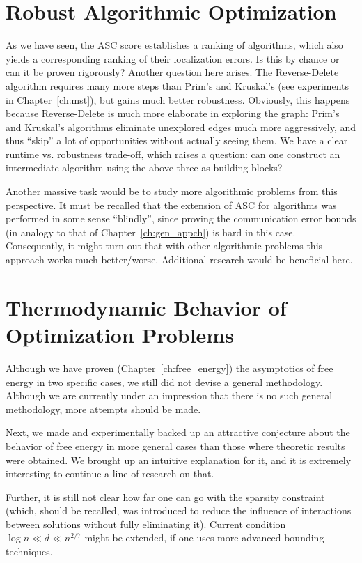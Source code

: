 \section{Robust Algorithmic Optimization}

As we have seen, the ASC score establishes a ranking of algorithms, which also
yields a corresponding ranking of their localization errors. Is this by chance or
can it be proven rigorously? Another question here arises. The
Reverse-Delete algorithm requires many more steps than Prim's and Kruskal's (see
experiments in Chapter~\ref{ch:mst}), but gains much better robustness.
Obviously, this happens because Reverse-Delete is much more elaborate in
exploring the graph: Prim's and Kruskal's algorithms eliminate unexplored edges
much more aggressively, and thus ``skip'' a lot of opportunities without
actually seeing them. We have a clear runtime vs. robustness trade-off, which
raises a question: can one construct an intermediate algorithm using the above
three as building blocks?

Another massive task would be to study more algorithmic problems from this
perspective. It must be recalled that the extension of ASC for algorithms was
performed in some sense ``blindly'', since proving the communication error
bounds (in analogy to that of Chapter~\ref{ch:gen_appch}) is hard in this case.
Consequently, it might turn out that with other algorithmic problems this
approach works much better/worse. Additional research would be beneficial here.

\section{Thermodynamic Behavior of Optimization Problems}

Although we have proven (Chapter~\ref{ch:free_energy}) the asymptotics of free
energy in two specific cases, we still did not devise a general
methodology. Although we are currently under an impression that there is no such
general methodology, more attempts should be made.

Next, we made and experimentally backed up an attractive conjecture about the
behavior of free energy in more general cases than those where
theoretic results were obtained. We brought up an intuitive explanation for it,
and it is extremely interesting to continue a line of research on that.

Further, it is still not clear how far one can go with the sparsity constraint
(which, should be recalled, was introduced to reduce the influence of
interactions between solutions without fully eliminating it). Current
condition $\log n \ll d \ll n^{2/7}$ might be extended, if one uses more
advanced bounding techniques.


